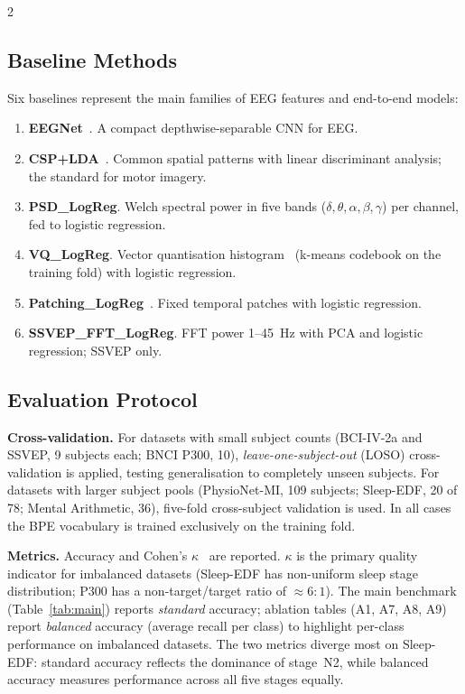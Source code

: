 \documentclass[14pt,a4paper]{extarticle}
\begin{document}
\begin{multicols}{2}
\subsection*{Baseline Methods}

Six baselines represent the main families of EEG features
and end-to-end models:
\begin{enumerate}[leftmargin=*,itemsep=1pt]
  \item \textbf{EEGNet}~\cite{lawhern2018eegnet}. A compact
    depthwise-separable CNN for EEG.
  \item \textbf{CSP+LDA}~\cite{blankertz2008csp}. Common
    spatial patterns with linear discriminant analysis;
    the standard for motor imagery.
  \item \textbf{PSD\_LogReg}. Welch spectral power
    in five bands ($\delta, \theta, \alpha, \beta, \gamma$)
    per channel, fed to logistic regression.
  \item \textbf{VQ\_LogReg}. Vector quantisation histogram~\cite{vqvae2017}
    (k-means codebook on the training fold) with logistic regression.
  \item \textbf{Patching\_LogReg}~\cite{nie2023patching}.
    Fixed temporal patches with logistic regression.
  \item \textbf{SSVEP\_FFT\_LogReg}. FFT power 1--45~Hz
    with PCA and logistic regression; SSVEP only.
\end{enumerate}

\subsection*{Evaluation Protocol}

\textbf{Cross-validation.}
For datasets with small subject counts
(BCI-IV-2a and SSVEP, 9 subjects each; BNCI P300, 10),
\emph{leave-one-subject-out} (LOSO) cross-validation is applied,
testing generalisation to completely unseen subjects.
For datasets with larger subject pools
(PhysioNet-MI, 109 subjects; Sleep-EDF, 20 of 78;
Mental Arithmetic, 36),
five-fold cross-subject validation is used.
In all cases the BPE vocabulary is trained exclusively on the
training fold.

\textbf{Metrics.}
Accuracy and Cohen's $\kappa$~\cite{cohen1960kappa}
are reported.
$\kappa$ is the primary quality indicator for imbalanced datasets
(Sleep-EDF has non-uniform sleep stage distribution;
P300 has a non-target/target ratio of $\approx 6{:}1$).
The main benchmark (Table~\ref{tab:main}) reports \emph{standard}
accuracy; ablation tables (A1, A7, A8, A9) report
\emph{balanced} accuracy (average recall per class) to
highlight per-class performance on imbalanced datasets.
The two metrics diverge most on Sleep-EDF: standard accuracy
reflects the dominance of stage~N2, while balanced accuracy
measures performance across all five stages equally.


\end{multicols}
\end{document}
